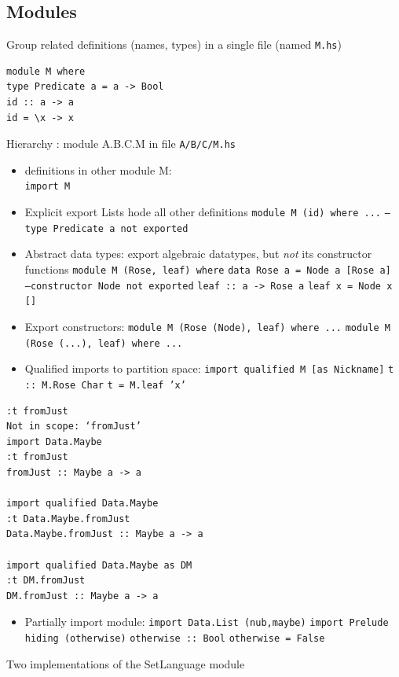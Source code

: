 \documentclass{article}
\newcommand{\Haskell}[1]{\texttt{#1}}
\begin{document}
\subsection{Modules}
Group related definitions (names, types) in a single file (named \verb|M.hs|)
\begin{verbatim}
module M where
type Predicate a = a -> Bool
id :: a -> a
id = \x -> x
\end{verbatim}
Hierarchy : module A.B.C.M in file \verb|A/B/C/M.hs|
\begin{itemize}
\item definitions in other module M:\\
\subitem \Haskell{import M}
\item Explicit export Lists hode all other definitions
\subitem \Haskell{module M (id) where ...}
\subsubitem \Haskell{--type Predicate a not exported} 
\item Abstract data types: export algebraic datatypes, but \emph{not} its constructor functions
\subitem \Haskell{module M (Rose, leaf) where}
\subitem \Haskell{data Rose a = Node a [Rose a] --constructor Node not exported}
\subitem \Haskell{leaf :: a -> Rose a}
\subitem \Haskell{leaf x = Node x []}
\item Export constructors:
\subitem \Haskell{module M (Rose (Node), leaf) where ...}
\subitem \Haskell{module M (Rose (...), leaf)  where ...}
\item Qualified imports to partition space:
\subitem \Haskell{import qualified M [as Nickname]}
\subitem \Haskell{t :: M.Rose Char}
\subitem \Haskell{t = M.leaf 'x'}
\end{itemize}
\begin{verbatim}
:t fromJust
Not in scope: ‘fromJust’
import Data.Maybe
:t fromJust
fromJust :: Maybe a -> a

import qualified Data.Maybe
:t Data.Maybe.fromJust
Data.Maybe.fromJust :: Maybe a -> a

import qualified Data.Maybe as DM
:t DM.fromJust
DM.fromJust :: Maybe a -> a
\end{verbatim}
\begin{itemize}
\item Partially import module:
\subitem \Haskell{import Data.List (nub,maybe)}
\subitem \Haskell{import Prelude hiding (otherwise)}
\subitem \Haskell{otherwise :: Bool}
\subitem \Haskell{otherwise = False}
\end{itemize}
\begin{listing}[h!]
\caption{Two implementations of the SetLanguage module}
\inputminted{Haskell}{SetLanguage.hs}
\inputminted{Haskell}{SetlanguageFunction.hs}
\end{listing}
\clearpage
\end{document}
